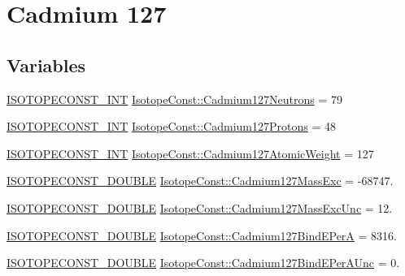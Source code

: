 \hypertarget{group___isotope_const-_cadmium-_cd127}{}\section{Cadmium 127}
\label{group___isotope_const-_cadmium-_cd127}
\subsection*{Variables}
\begin{DoxyCompactItemize}
\item 
\mbox{\hyperlink{group___isotope_const-_macros_ga5f18360b3e99483a35c32d789e62621c}{I\+S\+O\+T\+O\+P\+E\+C\+O\+N\+S\+T\+\_\+\+I\+NT}} \mbox{\hyperlink{group___isotope_const-_cadmium-_cd127_ga7b5220a2d5a775e3617433987851a9da}{Isotope\+Const\+::\+Cadmium127\+Neutrons}} = 79
\item 
\mbox{\hyperlink{group___isotope_const-_macros_ga5f18360b3e99483a35c32d789e62621c}{I\+S\+O\+T\+O\+P\+E\+C\+O\+N\+S\+T\+\_\+\+I\+NT}} \mbox{\hyperlink{group___isotope_const-_cadmium-_cd127_ga4a70e219d2e6454d00f8aaf7b61c1796}{Isotope\+Const\+::\+Cadmium127\+Protons}} = 48
\item 
\mbox{\hyperlink{group___isotope_const-_macros_ga5f18360b3e99483a35c32d789e62621c}{I\+S\+O\+T\+O\+P\+E\+C\+O\+N\+S\+T\+\_\+\+I\+NT}} \mbox{\hyperlink{group___isotope_const-_cadmium-_cd127_gadfbe90483ccb59461cb5076d5abccdf1}{Isotope\+Const\+::\+Cadmium127\+Atomic\+Weight}} = 127
\item 
\mbox{\hyperlink{group___isotope_const-_macros_ga8f45a7272ce02c0b4c65c44636ed719a}{I\+S\+O\+T\+O\+P\+E\+C\+O\+N\+S\+T\+\_\+\+D\+O\+U\+B\+LE}} \mbox{\hyperlink{group___isotope_const-_cadmium-_cd127_gaca22582ab8a8753fbeb8bed9e1212cc2}{Isotope\+Const\+::\+Cadmium127\+Mass\+Exc}} = -\/68747.
\item 
\mbox{\hyperlink{group___isotope_const-_macros_ga8f45a7272ce02c0b4c65c44636ed719a}{I\+S\+O\+T\+O\+P\+E\+C\+O\+N\+S\+T\+\_\+\+D\+O\+U\+B\+LE}} \mbox{\hyperlink{group___isotope_const-_cadmium-_cd127_gaffe303a405ff739e36e36fbcde0b1539}{Isotope\+Const\+::\+Cadmium127\+Mass\+Exc\+Unc}} = 12.
\item 
\mbox{\hyperlink{group___isotope_const-_macros_ga8f45a7272ce02c0b4c65c44636ed719a}{I\+S\+O\+T\+O\+P\+E\+C\+O\+N\+S\+T\+\_\+\+D\+O\+U\+B\+LE}} \mbox{\hyperlink{group___isotope_const-_cadmium-_cd127_gab06e9fe7cbefd68e0ca368f089910a8f}{Isotope\+Const\+::\+Cadmium127\+Bind\+E\+PerA}} = 8316.
\item 
\mbox{\hyperlink{group___isotope_const-_macros_ga8f45a7272ce02c0b4c65c44636ed719a}{I\+S\+O\+T\+O\+P\+E\+C\+O\+N\+S\+T\+\_\+\+D\+O\+U\+B\+LE}} \mbox{\hyperlink{group___isotope_const-_cadmium-_cd127_ga3821d42e3b16dc16ef608cdc8c70ae99}{Isotope\+Const\+::\+Cadmium127\+Bind\+E\+Per\+A\+Unc}} = 0.

\end{DoxyCompactItemize}
